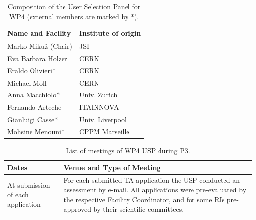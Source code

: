 \begin{table}[H]
\caption{Composition of the User Selection Panel for WP4 (external members are marked by *).}
\centering
{\color{black}\begin{tabular}{|L{0.4\textwidth}|C{0.6\textwidth}|} \hline
    {\bf Name and Facility} & {\bf Institute of origin} \\ \hline
    Marko Mikuž (Chair)	& JSI \\ \hline
    Eva Barbara Holzer	& CERN \\ \hline
    Eraldo Olivieri*	& CERN \\ \hline
    Michael Moll	& CERN \\ \hline
    Anna Macchiolo*	& Univ. Zurich \\ \hline
    Fernando Arteche & 	ITAINNOVA \\ \hline
    Gianluigi Casse* &	Univ. Liverpool \\ \hline
    Mohsine Menouni*& 	CPPM Marseille \\ \hline
\end{tabular}}
\label{tab:usp-wp4}
\end{table}

\begin{table}[H]
\caption{List of meetings of WP4 USP during P3.}
\centering
{\color{black}\begin{tabular}{|L{0.2\textwidth}|C{0.8\textwidth}|} \hline
    {\bf Dates} & {\bf Venue and Type of Meeting} \\ \hline
    At submission of each application & For each submitted TA application the USP conducted an assessment by e-mail. All applications were pre-evaluated by the respective Facility Coordinator, and for some RIs pre-approved by their scientific committees. \\ \hline 
\end{tabular}}
\label{tab:usp-wp4-meet}
\end{table}
